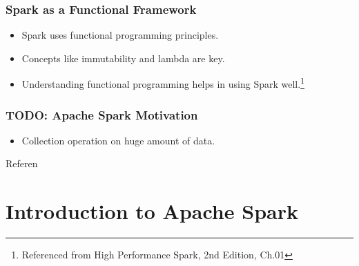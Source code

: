 \begin{frame}
    \frametitle{Spark as a Functional Framework}
    \begin{itemize}
        \item Spark uses functional programming principles.
        \item Concepts like immutability and lambda are key.
        \item Understanding functional programming helps in using Spark well.\footnote{Referenced from High Performance Spark, 2nd Edition, Ch.01}
    \end{itemize}

\end{frame}


\begin{frame}
    \frametitle{TODO: Apache Spark Motivation}
    \begin{itemize}
        \item Collection operation on huge amount of data.
    \end{itemize}
    Referen
\end{frame}
\section{Introduction to Apache Spark}\label{sec:introduction-to-apache-spark}

